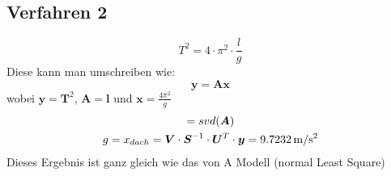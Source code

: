 \subsection{Verfahren 2}
\begin{equation*}
	T^2 = 4 \cdot \pi^2 \cdot \frac{l}{g}
\end{equation*}
Diese kann man umschreiben wie:
\begin{equation*}
	\bm{y} = \bm{Ax}
\end{equation*}
wobei $\bm{y} = \bm{T}^2$, $\bm{A} = \bm{l}$ und $\bm{x} = \frac{4 \pi^2}{g}$
\begin{gather*}
	[\bm{U},\bm{S},\bm{V}] = svd(\bm{A}) \\
	g = x_{dach} = \bm{V} \cdot \bm{S}^{-1} \cdot \bm{U}^T \cdot \bm{y} = 9.7232 \ut{m/s^2}
\end{gather*}
Dieses Ergebnis ist ganz gleich wie das von A Modell (normal Least Square)
